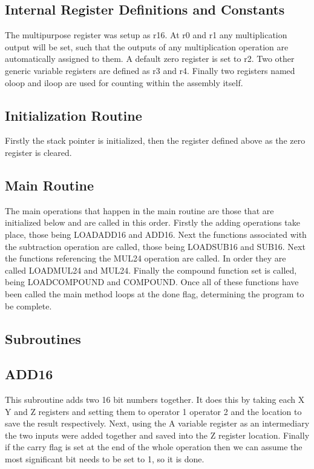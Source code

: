 \documentclass[12pt,letterpaper]{article}
\begin{document}
\subsection{Internal Register Definitions and Constants}
The multipurpose register was setup as r16. At r0 and r1 any multiplication output will be set, such that the outputs of any multiplication operation are automatically assigned to them. A default zero register is set to r2. Two other generic variable registers are defined as r3 and r4. Finally two registers named oloop and iloop are used for counting within the assembly itself.

\subsection{Initialization Routine}
Firstly the stack pointer is initialized, then the register defined above as the zero register is cleared.

\subsection{Main Routine}
The main operations that happen in the main routine are those that are initialized below and are called in this order. Firstly the adding operations take place, those being LOADADD16 and ADD16. Next the functions associated with the subtraction operation are called, those being LOADSUB16 and SUB16. Next the functions referencing the MUL24 operation are called. In order they are called LOADMUL24 and MUL24. Finally the compound function set is called, being LOADCOMPOUND and COMPOUND. Once all of these functions have been called the main method loops at the done flag, determining the program to be complete.


\subsection{Subroutines}
	\subsection{ADD16}
	This subroutine adds two 16 bit numbers together. It does this by taking each X Y and Z registers and setting them to operator 1 operator 2 and the location to save the result respectively. Next, using the A variable register as an intermediary the two inputs were added together and saved into the Z register location. Finally if the carry flag is set at the end of the whole operation then we can assume the most significant bit needs to be set to 1, so it is done. 
	
\end{document}
